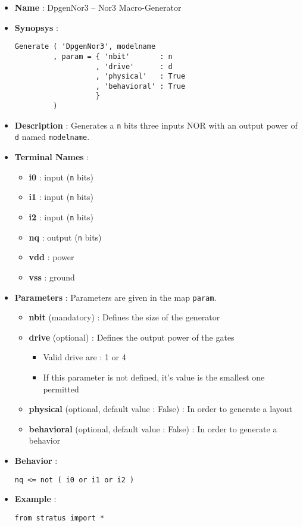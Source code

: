 \begin{itemize}
    \item \textbf{Name} : DpgenNor3 -- Nor3 Macro-Generator
    \item \textbf{Synopsys} :
\begin{verbatim}
Generate ( 'DpgenNor3', modelname
         , param = { 'nbit'       : n
                   , 'drive'      : d
                   , 'physical'   : True
                   , 'behavioral' : True                   
                   }
         )
\end{verbatim}
    \item \textbf{Description} : Generates a \verb-n- bits three inputs NOR with an output power of \verb-d- named \verb-modelname-.
    \item \textbf{Terminal Names} :
    \begin{itemize}
        \item \textbf{i0} : input (\verb-n- bits)
        \item \textbf{i1} : input (\verb-n- bits)
        \item \textbf{i2} : input (\verb-n- bits)
        \item \textbf{nq} : output (\verb-n- bits)
        \item \textbf{vdd} : power
        \item \textbf{vss} : ground
    \end{itemize}
    \item \textbf{Parameters} : Parameters are given in the map \verb-param-.
    \begin{itemize}
        \item \textbf{nbit} (mandatory) : Defines the size of the generator
        \item \textbf{drive} (optional) : Defines the output power of the gates
        \begin{itemize}
            \item Valid drive are : 1 or 4
            \item If this parameter is not defined, it's value is the smallest one permitted
        \end{itemize}
        \item \textbf{physical} (optional, default value : False) : In order to generate a layout
        \item \textbf{behavioral} (optional, default value : False) : In order to generate a behavior        
    \end{itemize}
    \item \textbf{Behavior} :
\begin{verbatim}
nq <= not ( i0 or i1 or i2 )
\end{verbatim}
    \item \textbf{Example} :
\begin{verbatim}
from stratus import *


\end{verbatim}
\end{itemize}
